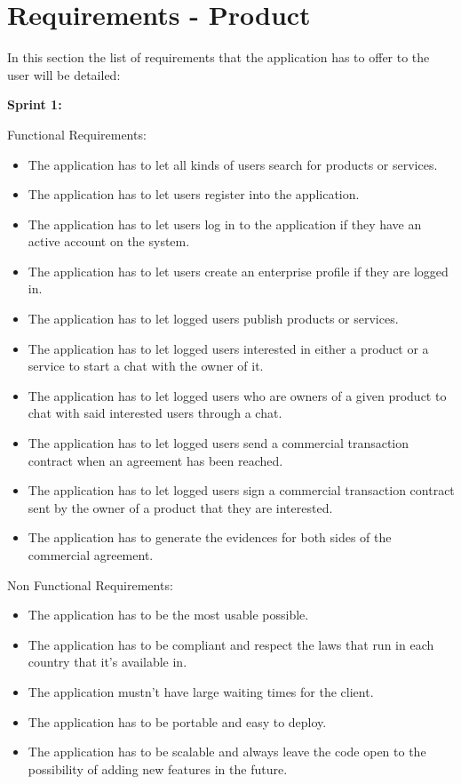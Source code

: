 \documentclass[./main.tex]{subfiles}
\begin{document}

\section{Requirements - Product}

In this section the list of requirements that the application has to
offer to the user will be detailed:

\textbf{Sprint 1:}

Functional Requirements:

\begin{itemize}

\item
  The application has to let all kinds of users search for products or
  services.
\item
  The application has to let users register into the application.
\item
  The application has to let users log in to the application if they
  have an active account on the system.
\item
  The application has to let users create an enterprise profile if they
  are logged in.
\item
  The application has to let logged users publish products or services.
\item
  The application has to let logged users interested in either a product
  or a service to start a chat with the owner of it.
\item
  The application has to let logged users who are owners of a given
  product to chat with said interested users through a chat.
\item
  The application has to let logged users send a commercial transaction
  contract when an agreement has been reached.
\item
  The application has to let logged users sign a commercial transaction
  contract sent by the owner of a product that they are interested.
\item
  The application has to generate the evidences for both sides of the
  commercial agreement.
\end{itemize}

Non Functional Requirements:

\begin{itemize}

\item
  The application has to be the most usable possible.
\item
  The application has to be compliant and respect the laws that run in
  each country that it's available in.
\item
  The application mustn't have large waiting times for the client.
\item
  The application has to be portable and easy to deploy.
\item
  The application has to be scalable and always leave the code open to
  the possibility of adding new features in the future.
\end{itemize}
\end{document}
